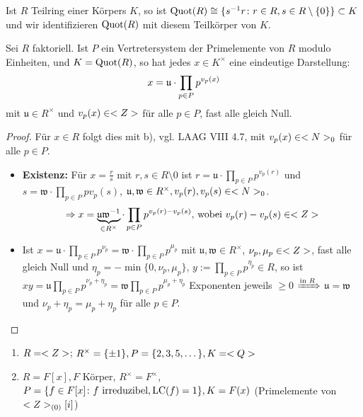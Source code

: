 \begin{remark}
	Ist $R$ Teilring einer Körpers $K$, so ist $\operatorname{Quot}(R) \cong \{s^{-1}r \colon r\in R, s \in R\setminus \{0\}\} \subset K$ und wir identifizieren $\operatorname{Quot}(R)$ mit diesem Teilkörper von $K$.
\end{remark}

\begin{proposition}
	Sei $R$ faktoriell. Ist $P$ ein Vertretersystem der Primelemente von $R$ modulo Einheiten, und $K = \operatorname{Quot}(R)$, so hat jedes $x \in K^{\times}$ eine eindeutige Darstellung:
	\begin{align}
		x = \mathfrak{u} \cdot \prod_{p\in P} p^{v_p(x)} \notag
	\end{align}
	mit $\mathfrak{u} \in R^{\times}$ und $v_p(x) \in <Z>$ für alle $p \in P$, fast alle gleich Null.
\end{proposition}

\begin{proof}
	Für $x \in R$ folgt dies mit b), vgl. LAAG VIII 4.7, mit $v_p(x) \in <N>_0$ für alle $p \in P$.
	\begin{itemize}
		\item \textbf{Existenz:} Für $x=\frac{r}{s}$ mit $r,s \in R\setminus {0}$ ist $r = \mathfrak{u} \cdot \prod_{p\in P} p^{v_p(r)}$ und $s = \mathfrak{w}\cdot \prod_{p\in P} p{v_p(s)}$, $\mathfrak{u}, \mathfrak{w} \in R^{\times}, v_p(r), v_p(s) \in <N>_0$.
		\begin{align} %
		\Rightarrow x = \underbrace{\mathfrak{u}\mathfrak{w}^{-1}}_{\in R^{\times}}\cdot \prod_{p\in P} p^{v_p(r)-v_p(s)}\text{, wobei } v_p(r) - v_p(s) \in \whole \notag
		\end{align}
		\item Ist $x=\mathfrak{u} \cdot \prod_{p\in P} p^{\nu_p} = \mathfrak{w} \cdot \prod_{p\in P} p^{\mu_p}$ mit $\mathfrak{u},\mathfrak{w} \in R^{\times}$, $\nu_p,\mu_p \in <Z>$, fast alle gleich Null und $\eta_p = - \min\{0, \nu_p,\mu_p\}$, $y:= \prod_{p\in P} p^{\eta_p} \in R$, so ist $xy = \mathfrak{u} \prod_{p\in P} p^{\nu_p + \eta_p} = \mathfrak{w} \prod_{p\in P} p ^{\mu_p + \eta_p}$ Exponenten jeweils $\ge 0$ $\xRightarrow{\text{in }R}$ $\mathfrak{u} = \mathfrak{w}$ und $\nu_p + \eta_p = \mu_p + \eta_p$ für alle $p \in P$.  
		\end{itemize}
\end{proof}

\begin{example} %
	\begin{enumerate}
		\item $R = <Z>$; $R^{\times} = \{\pm 1\}, P = \{2,3,5,\dots\}, K = <Q>$
		\item $R = F[x], F$ Körper, $R^{\times} = F^{\times}$, $P = \{f \in F[x]\colon f \text{ irreduzibel}, \operatorname{LC}(f) = 1\}, K = F(x)$ (Primelemente von $<Z>_{(0)}[i]$)
	\end{enumerate}
\end{example}

